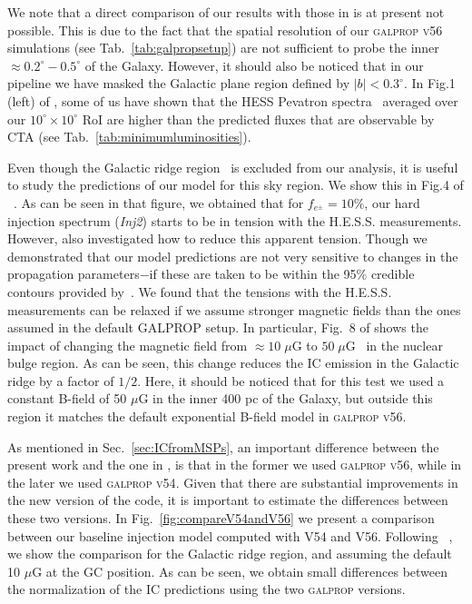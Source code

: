 \documentclass[doublespace,draft,nopageskip]{VTthesis} %
\begin{document}
\begin{appendices}
 We note that a direct comparison of our results with those in \citet{Hooper:2018fih} is at present not possible. This is due to the fact that the spatial resolution of our \textsc{galprop v56} simulations (see Tab.~\ref{tab:galpropsetup}) are not sufficient to probe the inner $\approx 0.2^\circ-0.5^\circ$ of the Galaxy. However, it should also be noticed that in our pipeline we have masked the Galactic plane region defined by $|b|<0.3^\circ$. In Fig.1 (left) of \citep{Rinchiuso:2020skh}, some of us have shown that the HESS Pevatron spectra~\citep{Abramowski:2016mir} averaged over our $10^\circ \times 10^\circ$ RoI are higher than the predicted fluxes that are observable by CTA (see Tab.~\ref{tab:minimumluminosities}). 


Even though the Galactic ridge region~\citep{Aharonian:2006au} is excluded from our analysis, it is useful to study the predictions of our model for this sky region. We show this in Fig.4 of ~\citep{Song:2019nrx}. As can be seen in that figure,
we obtained that for $f_{e^\pm} = 10\%$, our hard injection spectrum (\textit{Inj2}) starts to be in tension with the H.E.S.S. measurements. However, \citet{Song:2019nrx} also investigated how to reduce this apparent tension. Though we demonstrated that our model predictions are not very sensitive to changes in the propagation parameters$-$if these are taken to be within the 95\% credible contours provided by~\citet{Johannesson:2016rlh}. We found that the tensions with the H.E.S.S. measurements can be relaxed if we assume stronger magnetic fields than the ones assumed in the default GALPROP setup. In particular, Fig.~8 of \citet{Song:2019nrx} shows the impact of changing the magnetic field from  $\approx 10\; \mu$G to $50\;\mu$G~\citep{Crocker:2010xc} in the nuclear bulge region. As can be seen, this change reduces the IC emission in the Galactic ridge by a factor of $1/2$.  Here, it should be noticed that for this test we used a constant B-field of 50 $\mu$G in the inner 400 pc of the Galaxy, but outside this region it matches the default exponential B-field model in \textsc{galprop v56}.  

As mentioned in Sec.~\ref{sec:ICfromMSPs}, an important difference between the present work and the one in \citep{Song:2019nrx}, is that in the former we used \textsc{galprop v56}, while in the later we used \textsc{galprop v54}. Given that there are substantial improvements in the new version of the code, it is important to estimate the differences between these two versions. In Fig.~\ref{fig:compareV54andV56} we present a comparison between our baseline injection model computed with V54 and V56. Following ~\citep{Song:2019nrx}, we show the comparison for the Galactic ridge region, and assuming the default 10 $\mu$G at the GC position. As can be seen, we obtain small differences between the normalization of the IC predictions using the two \textsc{galprop} versions.
 

\end{appendices}
\end{document}
